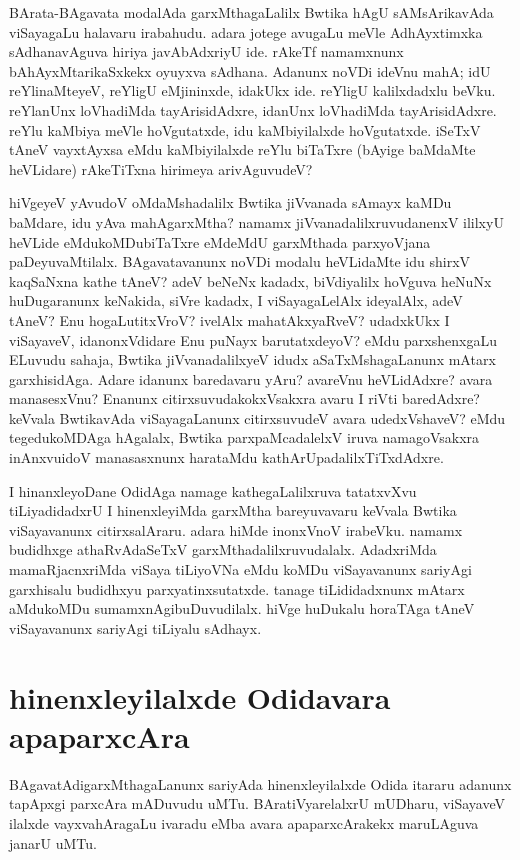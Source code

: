 BArata-BAgavata modalAda garxMthagaLalilx Bwtika hAgU sAMsArikavAda viSayagaLu halavaru irabahudu. adara jotege avugaLu meVle AdhAyxtimxka sAdhanavAguva hiriya javAbAdxriyU ide. rAkeTf namamxnunx bAhAyxMtarikaSxkekx oyuyxva sAdhana. Adanunx noVDi ideVnu mahA; idU reYlinaMteyeV, reYligU eMjininxde, idakUkx ide. reYligU kalilxdadxlu beVku. reYlanUnx loVhadiMda tayArisidAdxre, idanUnx loVhadiMda tayArisidAdxre. reYlu kaMbiya meVle hoVgutatxde, idu kaMbiyilalxde hoVgutatxde. iSeTxV tAneV vayxtAyxsa eMdu kaMbiyilalxde reYlu biTaTxre (bAyige baMdaMte heVLidare) rAkeTiTxna hirimeya arivAguvudeV?

hiVgeyeV yAvudoV oMdaMshadalilx Bwtika jiVvanada sAmayx kaMDu baMdare, idu yAva mahAgarxMtha? namamx jiVvanadalilxruvudanenxV ililxyU heVLide eMdukoMDubiTaTxre  eMdeMdU garxMthada parxyoVjana paDeyuvaMtilalx. BAgavatavanunx noVDi modalu heVLidaMte idu shirxV kaqSaNxna kathe tAneV? adeV beNeNx kadadx, biVdiyalilx hoVguva heNuNx huDugaranunx keNakida, siVre kadadx, I viSayagaLelAlx ideyalAlx, adeV tAneV? Enu hogaLutitxVroV? ivelAlx mahatAkxyaRveV? udadxkUkx I viSayaveV, idanonxVdidare Enu puNayx barutatxdeyoV? eMdu parxshenxgaLu ELuvudu sahaja, Bwtika jiVvanadalilxyeV idudx aSaTxMshagaLanunx mAtarx garxhisidAga. Adare idanunx baredavaru yAru? avareVnu heVLidAdxre? avara manasesxVnu? Enanunx citirxsuvudakokxVsakxra avaru I riVti baredAdxre? keVvala BwtikavAda viSayagaLanunx citirxsuvudeV avara udedxVshaveV? eMdu tegedukoMDAga hAgalalx, Bwtika parxpaMcadalelxV iruva namagoVsakxra inAnxvuidoV manasasxnunx harataMdu kathArUpadalilxTiTxdAdxre.

I hinanxleyoDane OdidAga namage kathegaLalilxruva tatatxvXvu tiLiyadidadxrU I hinenxleyiMda garxMtha bareyuvavaru keVvala Bwtika viSayavanunx citirxsalAraru. adara hiMde inonxVnoV irabeVku. namamx budidhxge athaRvAdaSeTxV garxMthadalilxruvudalalx. AdadxriMda mamaRjacnxriMda viSaya tiLiyoVNa eMdu koMDu viSayavanunx sariyAgi garxhisalu budidhxyu parxyatinxsutatxde. tanage tiLididadxnunx mAtarx aMdukoMDu sumamxnAgibuDuvudilalx. hiVge huDukalu horaTAga tAneV viSayavanunx sariyAgi tiLiyalu sAdhayx.

\section*{hinenxleyilalxde Odidavara apaparxcAra}

BAgavatAdigarxMthagaLanunx sariyAda hinenxleyilalxde Odida itararu adanunx tapApxgi parxcAra mADuvudu uMTu. BAratiVyarelalxrU mUDharu, viSayaveV ilalxde vayxvahAragaLu ivaradu eMba avara apaparxcArakekx maruLAguva janarU uMTu.

